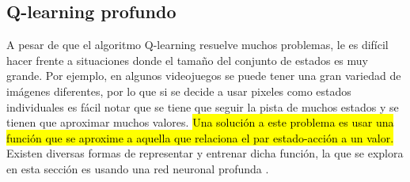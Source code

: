 	
	
	
	

\subsection{Q-learning profundo}

A pesar de que el algoritmo Q-learning resuelve muchos problemas, 
le es difícil hacer frente a situaciones donde el tamaño del conjunto de estados
es muy grande. Por ejemplo, en algunos videojuegos se puede tener una gran variedad
de imágenes diferentes, por lo que  si se decide a usar pixeles como 
estados individuales es fácil notar que se tiene que seguir la pista de muchos
estados y se tienen que aproximar muchos valores. 
\hl{Una solución a este problema es usar una función que se aproxime a aquella que relaciona
el par estado-acción a un valor.}
Existen diversas formas de representar y entrenar dicha función, la que 
se explora en esta sección es usando una red neuronal profunda \cite{lapan_2020, Goodfellow-et-al-2016}.

